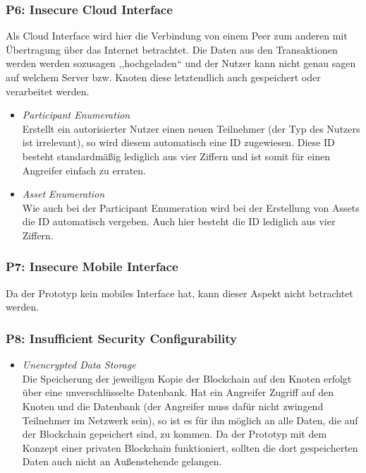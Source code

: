         \subsubsection*{P6: Insecure Cloud Interface}
            Als Cloud Interface wird hier die Verbindung von einem Peer zum anderen mit Übertragung über das Internet betrachtet.
            Die Daten aus den Transaktionen werden werden sozusagen ,,hochgeladen`` und der Nutzer kann nicht genau sagen auf welchem Server bzw. Knoten diese letztendlich auch gespeichert oder verarbeitet werden.
            \begin{itemize}[leftmargin=0cm,label={}]
                \item \emph{Participant Enumeration}\label{vuln:prototype_enum_part}\\
                    Erstellt ein autorisierter Nutzer einen neuen Teilnehmer (der Typ des Nutzers ist irrelevant), so wird diesem automatisch eine ID zugewiesen. 
                    Diese ID besteht standardmäßig lediglich aus vier Ziffern und ist somit für einen Angreifer einfach zu erraten.
                \item \emph{Asset Enumeration}\label{vuln:prototype_enum_asset}\\
                    Wie auch bei der Participant Enumeration wird bei der Erstellung von Assets die ID automatisch vergeben. 
                    Auch hier besteht die ID lediglich aus vier Ziffern.
            \end{itemize}
            
        \subsubsection*{P7: Insecure Mobile Interface}
            Da der Prototyp kein mobiles Interface hat, kann dieser Aspekt nicht betrachtet werden.
            
        \newpage
        \subsubsection*{P8: Insufficient Security Configurability}
            \begin{itemize}[leftmargin=0cm,label={}]
    	        \item \emph{Unencrypted Data Storage}\label{vuln:prototype_db}\\
                    Die Speicherung der jeweiligen Kopie der Blockchain auf den Knoten erfolgt über eine unverschlüsselte Datenbank. 
                    Hat ein Angreifer Zugriff auf den Knoten und die Datenbank (der Angreifer muss dafür nicht zwingend Teilnehmer im Netzwerk sein), so ist es für ihn möglich an alle Daten, die auf der Blockchain gepeichert sind, zu kommen. 
                    Da der Prototyp mit dem Konzept einer privaten Blockchain funktioniert, sollten die dort gespeicherten Daten auch nicht an Außenstehende gelangen.
            \end{itemize}
            
